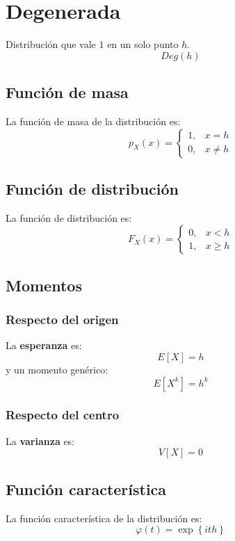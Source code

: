 \section{Degenerada}
\label{sec:degenerada}
Distribución que vale $1$ en un solo punto $h$. 
\[
Deg\left( h \right)
\]

\subsection{Función de masa}
La función de masa de la distribución es:
\[
p_X \left( x \right) = \begin{cases}
    1, &x = h\\
    0, &x \neq h
\end{cases}
\]

\subsection{Función de distribución}
La función de distribución es:
\[
F_X\left( x \right) = \begin{cases}
    0, &x < h\\ 
    1, &x \ge h
\end{cases}
\]

\subsection{Momentos}

\subsubsection*{Respecto del origen}
La \textbf{esperanza} es: 
\[
    E\left[ X \right] = h
\]
y un momento genérico: 
\[
    E\left[ X^k \right] = h^k
\]
\subsubsection*{Respecto del centro}
La \textbf{varianza} es:
\[
    V\left[ X \right] = 0
\]

\subsection{Función característica}
La función característica de la distribución es:
\[
\varphi\left( t \right) = \exp\left\{ ith \right\}
\]

